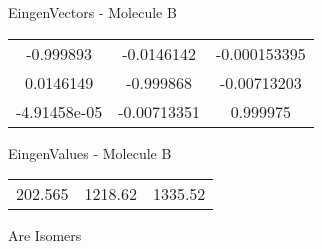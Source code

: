 \begin{multicols}{2}
\begin{center}
\vtab
 EingenVectors - Molecule B     \\
\vtab
\begin{tabular}{|c c c|}
-0.999893	 & 	-0.0146142	 & 	-0.000153395	 \\
0.0146149	 & 	-0.999868	 & 	-0.00713203	 \\
-4.91458e-05	 & 	-0.00713351	 & 	0.999975
\end{tabular}

\vtab
 EingenValues - Molecule B     \\
\vtab
\begin{tabular}{|c c c|}
202.565	 & 	1218.62	 & 	1335.52
\end{tabular}

\end{center}
\end{multicols}
\begin{center}
\vtab
\vtab
\textcolor{NavyBlue}{\Large Are Isomers}
\end{center}
\newpage

